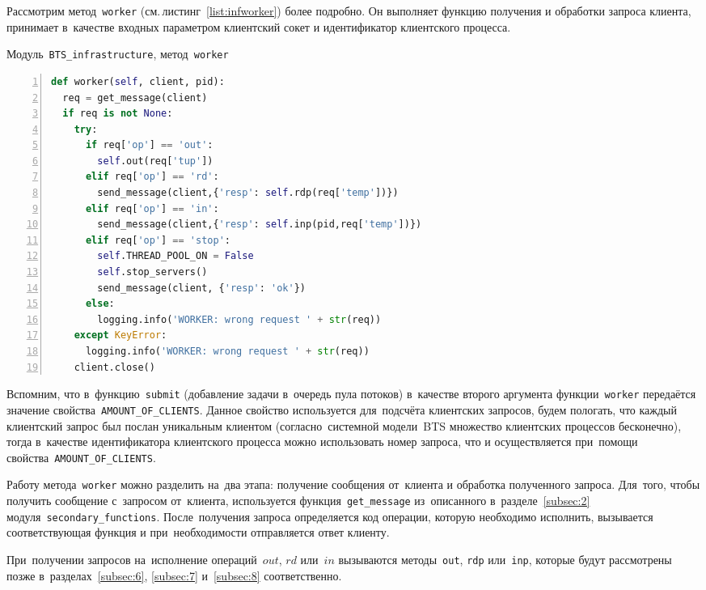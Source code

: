 Рассмотрим метод~\texttt{worker} (см.\,листинг~\ref{list:infworker}) более подробно. Он выполняет функцию получения и обработки запроса клиента, принимает в~качестве входных параметром клиентский сокет и идентификатор клиентского процесса.
\begin{ListingEnv}\caption{Модуль~\texttt{BTS\_infrastructure}, метод~\texttt{worker}}\label{list:infworker}
	\begin{lstlisting}[language=Python, numbers=left]
def worker(self, client, pid):
  req = get_message(client)
  if req is not None:
    try:
      if req['op'] == 'out':
        self.out(req['tup'])
      elif req['op'] == 'rd':
        send_message(client,{'resp': self.rdp(req['temp'])})
      elif req['op'] == 'in':
        send_message(client,{'resp': self.inp(pid,req['temp'])})
      elif req['op'] == 'stop':
        self.THREAD_POOL_ON = False
        self.stop_servers()
        send_message(client, {'resp': 'ok'})
      else:
        logging.info('WORKER: wrong request ' + str(req))
    except KeyError:
      logging.info('WORKER: wrong request ' + str(req))
    client.close()
	\end{lstlisting}
\end{ListingEnv}
Вспомним, что в~функцию~\texttt{submit} (добавление задачи в~очередь пула потоков) в~качестве второго аргумента функции~\texttt{worker} передаётся значение свойства~\texttt{AMOUNT_OF_CLIENTS}. Данное свойство используется для~подсчёта клиентских запросов, будем пологать, что каждый клиентский запрос был послан уникальным клиентом (согласно~системной модели~BTS множество клиентских процессов бесконечно), тогда в~качестве идентификатора клиентского процесса можно использовать номер запроса, что и осуществляется при~помощи свойства~\texttt{AMOUNT_OF_CLIENTS}.

Работу метода~\texttt{worker} можно разделить на~два этапа: получение сообщения от~клиента и обработка полученного запроса. Для~того, чтобы получить сообщение с~запросом от~клиента, используется функция~\texttt{get_message} из~описанного в~разделе~\ref{subsec:2} модуля~\texttt{secondary\_functions}. После~получения запроса определяется код операции, которую необходимо исполнить, вызывается соответствующая функция и при~необходимости отправляется ответ клиенту.

При~получении запросов на~исполнение операций~$out$, $rd$ или~$in$ вызываются методы~\texttt{out}, \texttt{rdp} или~\texttt{inp}, которые будут рассмотрены позже в~разделах~\ref{subsec:6}, \ref{subsec:7} и~\ref{subsec:8} соответственно.

